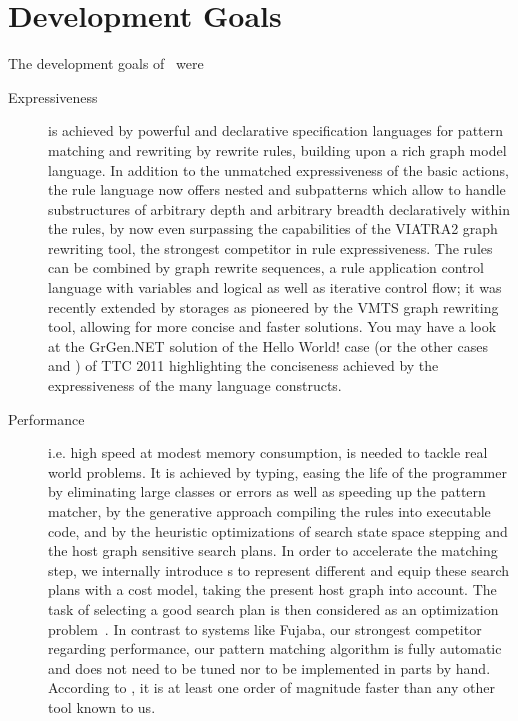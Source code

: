 \section{Development Goals}

The development goals of \GrG\ were

\begin{description}

\item[Expressiveness]
is achieved by powerful and declarative specification languages for pattern matching and rewriting by rewrite rules, building upon a rich graph model language.
In addition to the unmatched expressiveness of the basic actions,
the rule language now offers nested and subpatterns which allow to handle substructures of arbitrary depth and arbitrary breadth declaratively within the rules,
by now even surpassing the capabilities of the VIATRA2\cite{viatra2,recursiveviatra} graph rewriting tool, the strongest competitor in rule expressiveness.
The rules can be combined by graph rewrite sequences, a rule application control language with variables and logical as well as iterative control flow;
it was recently extended by storages as pioneered by the VMTS\cite{vmts} graph rewriting tool, allowing for more concise and faster solutions.
You may have a look at the GrGen.NET solution of the Hello World! case \cite{HelloWorld} (or the other cases \cite{ProgramUnderstanding} and \cite{CompilerOptimization}) of TTC 2011 highlighting the conciseness achieved by the expressiveness of the many language constructs.

\item[Performance]
i.e. high speed at modest memory consumption, is needed to tackle real world problems.
It is achieved by typing, easing the life of the programmer by eliminating large classes or errors as well as speeding up the pattern matcher,
by the generative approach compiling the rules into executable code,
and by the heuristic optimizations of search state space stepping and the host graph sensitive search plans.
In order to accelerate the matching step, we internally introduce s
to represent different  and equip these search plans with a cost model, taking the present host graph into account.
The task of selecting a good search plan is then considered as an optimization problem~\cite{BKG:07,Bat:06}.
In contrast to systems like Fujaba\cite{fujaba,fuj}, our strongest competitor regarding performance,
our pattern matching algorithm is fully automatic and does not need to be tuned nor to be implemented in parts by hand.
According to \cite{varro_bench}, it is at least one order of magnitude faster than any other tool known to us.


\end{description}
